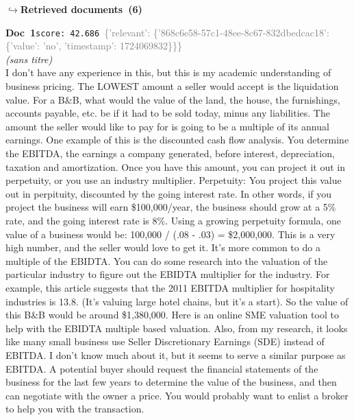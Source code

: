 \documentclass[a4paper,11pt]{article}
\begin{document}
\noindent\hfill{\footnotesize\textcolor{doccolor}{\textbf{$\hookrightarrow$\enspace Retrieved documents~(6)}}}
\begin{docenv}
{\footnotesize\textcolor{doccolor}{\textbf{Doc~1}}}\hfill{\tiny\texttt{score:~42.686}}\ {\tiny\textcolor{gray}{\{'relevant': \{'868c6e58-57c1-48ee-8c67-832dbedcac18': \{'value': 'no', 'timestamp': 1724069832\}\}\}}}\\[3pt]
{\small\textit{(sans titre)}}\\[2pt]
\vspace{2pt}
{\footnotesize 
I don't have any experience in this, but this is my academic understanding of business pricing.  The LOWEST amount a seller would accept is the liquidation value. For a B\&B, what would the value of the land, the house, the furnishings, accounts payable, etc. be if it had to be sold today, minus any liabilities.  The amount the seller would like to pay for is going to be a multiple of its annual earnings. One example of this is the discounted cash flow analysis. You determine the EBITDA, the earnings a company generated, before interest,  depreciation, taxation and amortization.  Once you have this amount, you can project it out in perpetuity, or you use an industry multiplier.  Perpetuity:  You project this value out in perpituity, discounted by the going interest rate. In other words, if you project the business will earn \$100,000/year, the business should grow at a 5\% rate, and the going interest rate is 8\%. Using a growing perpetuity formula, one value of a business would be: 100,000 / (.08 - .03) = \$2,000,000.  This is a very high number, and the seller would love to get it.  It's more common to do a multiple of the EBIDTA. You can do some research into the valuation of the particular industry to figure out the EBIDTA multiplier for the industry. For example, this article suggests that the 2011 EBITDA multiplier for hospitality industries is 13.8. (It's valuing large hotel chains, but it's a start). So the value of this B\&B would be around \$1,380,000. Here is an online SME valuation tool to help with the EBIDTA multiple based valuation. Also, from my research, it looks like many small business use Seller Discretionary Earnings  (SDE) instead of EBITDA. I don't know much about it, but it seems to serve a similar purpose as EBITDA.  A potential buyer should request the financial statements of the business for the last few years to determine the value of the business, and then can negotiate with the owner a price. You would probably want to enlist a broker to help you with the transaction.}
\end{docenv}
\end{document}
